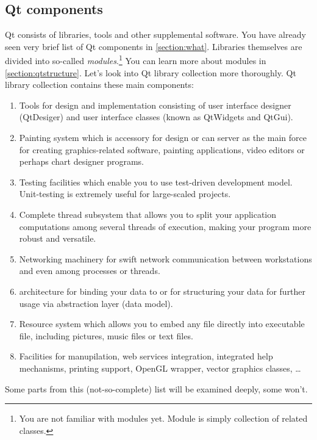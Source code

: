 \subsection{Qt components}
Qt consists of libraries, tools and other supplemental software. You have already seen very brief list of Qt components in \autoref{section:what}. Libraries themselves are divided into so-called \textit{modules}.\footnote{You are not familiar with modules yet. Module is simply collection of related classes.} You can learn more about modules in \autoref{section:qtstructure}. Let's look into Qt library collection more thoroughly. Qt library collection contains these main components:
\begin{enumerate}
\item Tools for  design and implementation consisting of user interface designer (QtDesiger) and user interface classes (known as QtWidgets and QtGui).
\item Painting system which is accessory for  design or can server as the main force for creating graphics-related software, \eg painting applications, video editors or perhaps chart designer programs.
\item Testing facilities which enable you to use test-driven development model. Unit-testing is extremely useful for large-scaled projects.
\item Complete thread subsystem that allows you to split your application computations among several threads of execution, making your program more robust and versatile.
\item Networking machinery for swift network communication between workstations and even among processes or threads.
\item {} architecture for binding your data to  or for structuring your data for further usage via abstraction layer (data model).
\item Resource system which allows you to embed any file directly into executable file, including pictures, music files or text files.
\item Facilities for  manupilation, web services integration, integrated help mechanisms, printing support, OpenGL wrapper, vector graphics classes, \ldots
\end{enumerate}

Some parts from this (not-so-complete) list will be examined deeply, some won't.


